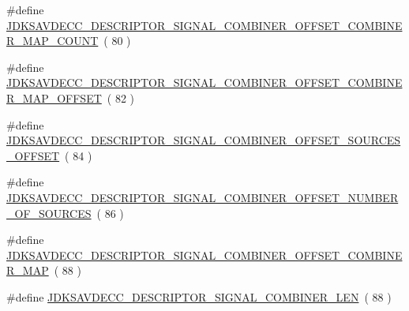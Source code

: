 \begin{DoxyCompactItemize}
\item 
\#define \hyperlink{group__descriptor__signal__combiner_ga4e808e837a1d968784975c179e2b4d8b}{J\+D\+K\+S\+A\+V\+D\+E\+C\+C\+\_\+\+D\+E\+S\+C\+R\+I\+P\+T\+O\+R\+\_\+\+S\+I\+G\+N\+A\+L\+\_\+\+C\+O\+M\+B\+I\+N\+E\+R\+\_\+\+O\+F\+F\+S\+E\+T\+\_\+\+C\+O\+M\+B\+I\+N\+E\+R\+\_\+\+M\+A\+P\+\_\+\+C\+O\+U\+NT}~( 80 )
\item 
\#define \hyperlink{group__descriptor__signal__combiner_gae1e69a0ecdeaeee6a59b36f60b9fc9d2}{J\+D\+K\+S\+A\+V\+D\+E\+C\+C\+\_\+\+D\+E\+S\+C\+R\+I\+P\+T\+O\+R\+\_\+\+S\+I\+G\+N\+A\+L\+\_\+\+C\+O\+M\+B\+I\+N\+E\+R\+\_\+\+O\+F\+F\+S\+E\+T\+\_\+\+C\+O\+M\+B\+I\+N\+E\+R\+\_\+\+M\+A\+P\+\_\+\+O\+F\+F\+S\+ET}~( 82 )
\item 
\#define \hyperlink{group__descriptor__signal__combiner_ga3b087bafb2d0aa78f3033ead31f06463}{J\+D\+K\+S\+A\+V\+D\+E\+C\+C\+\_\+\+D\+E\+S\+C\+R\+I\+P\+T\+O\+R\+\_\+\+S\+I\+G\+N\+A\+L\+\_\+\+C\+O\+M\+B\+I\+N\+E\+R\+\_\+\+O\+F\+F\+S\+E\+T\+\_\+\+S\+O\+U\+R\+C\+E\+S\+\_\+\+O\+F\+F\+S\+ET}~( 84 )
\item 
\#define \hyperlink{group__descriptor__signal__combiner_gaf0c32c392ce4ee1576fbeecb82124a67}{J\+D\+K\+S\+A\+V\+D\+E\+C\+C\+\_\+\+D\+E\+S\+C\+R\+I\+P\+T\+O\+R\+\_\+\+S\+I\+G\+N\+A\+L\+\_\+\+C\+O\+M\+B\+I\+N\+E\+R\+\_\+\+O\+F\+F\+S\+E\+T\+\_\+\+N\+U\+M\+B\+E\+R\+\_\+\+O\+F\+\_\+\+S\+O\+U\+R\+C\+ES}~( 86 )
\item 
\#define \hyperlink{group__descriptor__signal__combiner_ga4a18c9a05769228d2352be566bbed139}{J\+D\+K\+S\+A\+V\+D\+E\+C\+C\+\_\+\+D\+E\+S\+C\+R\+I\+P\+T\+O\+R\+\_\+\+S\+I\+G\+N\+A\+L\+\_\+\+C\+O\+M\+B\+I\+N\+E\+R\+\_\+\+O\+F\+F\+S\+E\+T\+\_\+\+C\+O\+M\+B\+I\+N\+E\+R\+\_\+\+M\+AP}~( 88 )
\item 
\#define \hyperlink{group__descriptor__signal__combiner_gadfdbfd7d2f63bf0ae8b9f7057823623c}{J\+D\+K\+S\+A\+V\+D\+E\+C\+C\+\_\+\+D\+E\+S\+C\+R\+I\+P\+T\+O\+R\+\_\+\+S\+I\+G\+N\+A\+L\+\_\+\+C\+O\+M\+B\+I\+N\+E\+R\+\_\+\+L\+EN}~( 88 )
\end{DoxyCompactItemize}
